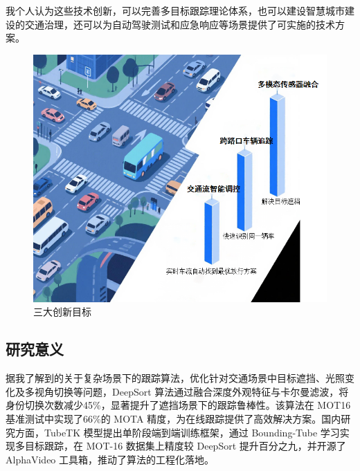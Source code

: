 我个人认为这些技术创新，可以完善多目标跟踪理论体系，也可以建设智慧城市建设的交通治理，还可以为自动驾驶测试和应急响应等场景提供了可实施的技术方案。




\begin{figure}[htbp] %
	\centering
	\includegraphics[width=1\textwidth]{p25} %
	\caption{三大创新目标} %
	\label{fig:p25} %
\end{figure}













\subsection{研究意义}


据我了解到的关于复杂场景下的跟踪算法，优化针对交通场景中目标遮挡、光照变化及多视角切换等问题，DeepSort 算法\cite{wojke2017simple}通过融合深度外观特征与卡尔曼滤波，将身份切换次数减少45\%，显著提升了遮挡场景下的跟踪鲁棒性。该算法在 MOT16 基准测试中实现了66\%的 MOTA 精度，为在线跟踪提供了高效解决方案。国内研究方面，TubeTK 模型提出单阶段端到端训练框架，通过 Bounding-Tube 学习实现多目标跟踪，在 MOT-16 数据集上精度较 DeepSort 提升百分之九，并开源了 AlphaVideo 工具箱，推动了算法的工程化落地。


